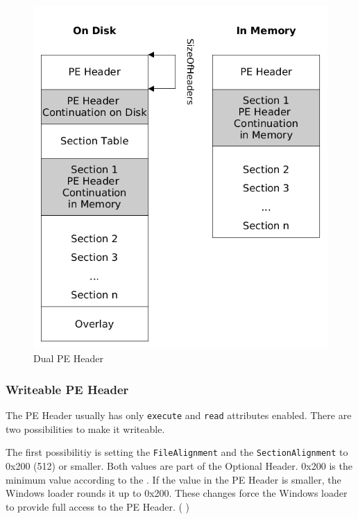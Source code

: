 \begin{figure}
\includegraphics[width=.98\textwidth, height=.60\textheight,keepaspectratio]{graphics/dualpeheader}
\caption{Dual PE Header}
\label{fig:dualpeheader} 
\end{figure}

\subsubsection*{Writeable PE Header} \label{subsubsec:writeableheader}

The PE Header usually has only \texttt{execute} and \texttt{read} attributes enabled. There are two possibilities to make it writeable. 

The first possibilitiy is setting the \texttt{FileAlignment} and the \texttt{SectionAlignment} to 0x200 (512) or smaller. Both values are part of the Optional Header. 0x200 is the minimum value according to the \PECOFF{} \cite[]{pespec}. If the value in the PE Header is smaller, the Windows loader rounds it up to 0x200.
These changes force the Windows loader to provide full access to the PE Header. (\cf{} \cite[]{revlabs11})

